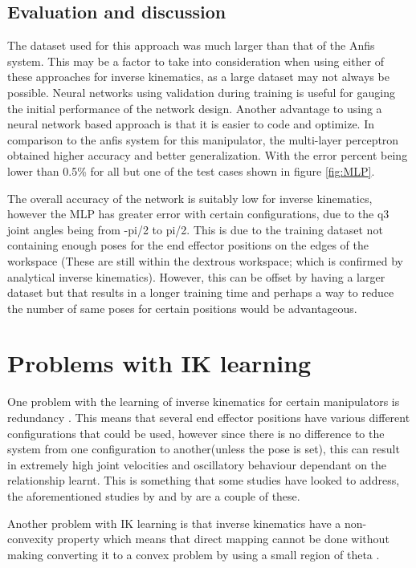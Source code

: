 \documentclass[a4paper,11pt]{article}
\begin{document}
\subsection{Evaluation and discussion}

The dataset used for this approach was much larger than that of the Anfis system. This may be a factor to take into consideration when using either of these approaches for inverse kinematics, as a large dataset may not always be possible.
Neural networks using validation during training is useful for gauging the initial performance of the network design. Another advantage to using a neural network based approach is that it is easier to code and optimize.
In comparison to the anfis system for this manipulator, the multi-layer perceptron obtained higher accuracy and better generalization. With the error percent being lower than 0.5\% for all but one of the test cases shown in figure \ref{fig:MLP}.

The overall accuracy of the network is suitably low for inverse kinematics, however the MLP has greater error with certain configurations, due to the q3 joint angles being from -pi/2 to pi/2. This is due to the training dataset not containing enough poses for the end effector positions on the edges of the workspace (These are still within the dextrous workspace; which is confirmed by analytical inverse kinematics). However, this can be offset by having a larger dataset but that results in a longer training time and perhaps a way to reduce the number of same poses for certain positions would be advantageous.




\section{Problems with IK learning}
One problem with the learning of inverse kinematics for certain manipulators is redundancy \citep{ikprob}. This means that several end effector positions have various different configurations that could be used, however since there is no difference to the system from one configuration to another(unless the pose is set), this can result in extremely high joint velocities and oscillatory behaviour dependant on the relationship learnt. This is something that some studies have looked to address, the aforementioned studies by \cite{genetic1} and by \cite{lwpr} are a couple of these. 

Another problem with IK learning is that inverse kinematics have a non-convexity property which means that direct mapping cannot be done without making converting it to a convex problem by using a small region of theta \citep{ikprob}.
\end{document}
